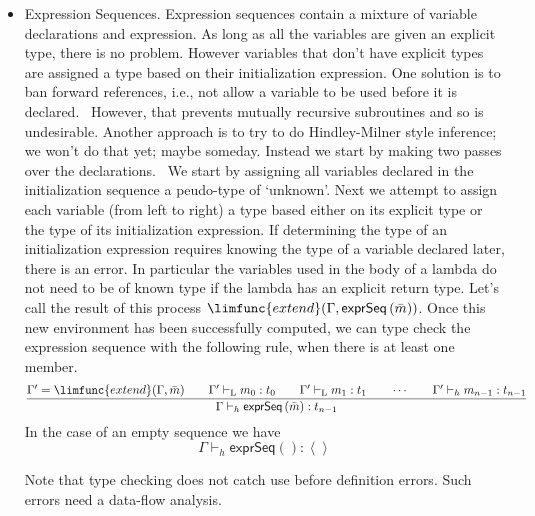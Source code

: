 \documentclass[12pt]{article}
\begin{document}
\begin{itemize}
\item Expression Sequences. Expression sequences contain a mixture of
variable declarations and expression. As long as all the variables are given
an explicit type, there is no problem. However variables that don't have
explicit types are assigned a type based on their initialization expression.
One solution is to ban forward references, i.e., not allow a variable to be
used before it is declared. \ However, that prevents mutually recursive
subroutines and so is undesirable. Another approach is to try to do
Hindley-Milner style inference; we won't do that yet; maybe someday. Instead
we start by making two passes over the declarations. \ We start by assigning
all variables declared in the initialization sequence a peudo-type of
`unknown'. Next we attempt to assign each variable (from left to right) a
type based either on its explicit type or the type of its initialization
expression. If determining the type of an initialization expression requires
knowing the type of a variable declared later, there is an error. In
particular the variables used in the body of a lambda do not need to be of
known type if the lambda has an explicit return type. Let's call the result
of this process $\limfunc{extend}(\Gamma ,\mathsf{exprSeq}\left( \bar{m}%
\right) )$. Once this new environment has been successfully computed, we can
type check the expression sequence with the following rule, when there is at
least one member.%
\begin{equation*}
\frac{\Gamma ^{\prime }=\limfunc{extend}(\Gamma ,\bar{m})\qquad \Gamma
^{\prime }\vdash _{\mathrm{L}}m_{0}:t_{0}\qquad \Gamma ^{\prime }\vdash _{%
\mathrm{L}}m_{1}:t_{1}\qquad \cdots \qquad \Gamma ^{\prime }\vdash
_{h}m_{n-1}:t_{n-1}}{\Gamma \vdash _{h}\mathsf{exprSeq}\left( \bar{m}\right)
:t_{n-1}}
\end{equation*}%
In the case of an empty sequence we have%
\begin{equation*}
\Gamma \vdash _{h}\mathsf{exprSeq}\left( {}\right) :\left\langle
{}\right\rangle
\end{equation*}

Note that type checking does not catch use before definition errors. Such
errors need a data-flow analysis.


\end{itemize}
\end{document}
